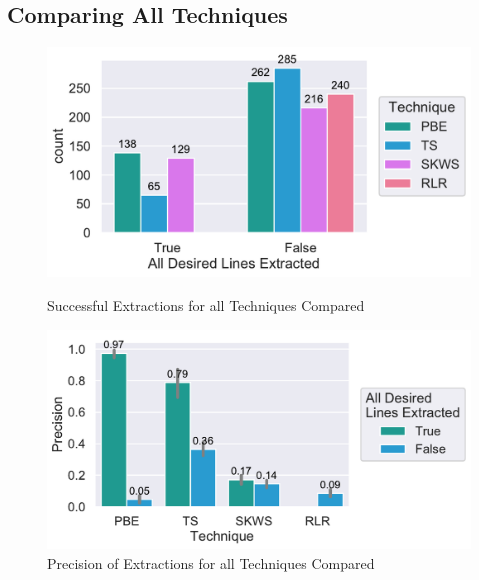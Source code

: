 \documentclass[\myrootdir/main.tex]{subfiles}
\begin{document}
\subsection{Comparing All Techniques}
\begin{figure}[htbp]
	\centering
	\begin{minipage}{0.45\textwidth}
		\centering
		\includegraphics[width=\textwidth, clip]{img/big-study/success-all.pdf}
		\caption{Successful Extractions for all Techniques Compared}
		\label{fig:success-all}
	\end{minipage}\hfill
	\begin{minipage}{0.45\textwidth}
		\centering
		\includegraphics[width=\textwidth, clip]{img/big-study/precision-all.pdf}
		\caption{Precision of Extractions for all Techniques Compared}
		\label{fig:precision-all}
	\end{minipage}
\end{figure}
\end{document}
